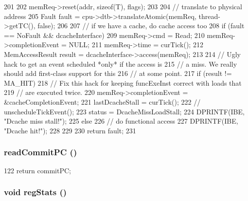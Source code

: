 \begin{DoxyCode}
201 {
202     memReq->reset(addr, sizeof(T), flags);
203 
204     // translate to physical address
205     Fault fault = cpu->dtb->translateAtomic(memReq, thread->getTC(), false);
206 
207     // if we have a cache, do cache access too
208     if (fault == NoFault && dcacheInterface) {
209         memReq->cmd = Read;
210         memReq->completionEvent = NULL;
211         memReq->time = curTick();
212         MemAccessResult result = dcacheInterface->access(memReq);
213 
214         // Ugly hack to get an event scheduled *only* if the access is
215         // a miss.  We really should add first-class support for this
216         // at some point.
217         if (result != MA_HIT) {
218             // Fix this hack for keeping funcExeInst correct with loads that
219             // are executed twice.
220             memReq->completionEvent = &cacheCompletionEvent;
221             lastDcacheStall = curTick();
222 //          unscheduleTickEvent();
223             status = DcacheMissLoadStall;
224             DPRINTF(IBE, "Dcache miss stall!\n");
225         } else {
226             // do functional access
227             DPRINTF(IBE, "Dcache hit!\n");
228         }
229     }
230     return fault;
231 }
\end{DoxyCode}
\hypertarget{classInorderBackEnd_aa28f3fe58fde4b038a92b9f87a40cb10}{
\subsubsection[{readCommitPC}]{ readCommitPC ()}}
\label{classInorderBackEnd_aa28f3fe58fde4b038a92b9f87a40cb10}



\begin{DoxyCode}
122 { return commitPC; }
\end{DoxyCode}
\hypertarget{classInorderBackEnd_a4dc637449366fcdfc4e764cdf12d9b11}{
\subsubsection[{regStats}]{\setlength{\rightskip}{0pt plus 5cm}void regStats ()}}
\label{classInorderBackEnd_a4dc637449366fcdfc4e764cdf12d9b11}



